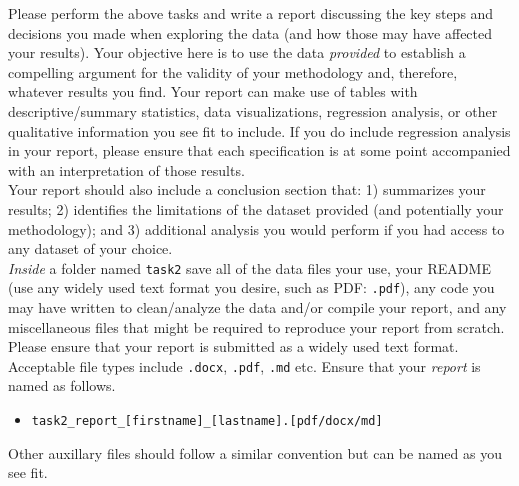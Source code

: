 \documentclass[11pt, letterpaper, twoside]{article}
\begin{document}
Please perform the above tasks and write a report discussing the key steps and decisions you made when exploring the data (and how those may have affected your results). Your objective here is to use the data \textit{provided} to establish a compelling argument for the validity of your methodology and, therefore, whatever results you find. Your report can make use of tables with descriptive/summary statistics, data visualizations, regression analysis, or other qualitative information you see fit to include. If you do include regression analysis in your report, please ensure that each specification is at some point accompanied with an interpretation of those results.\\

Your report should also include a conclusion section that: 1) summarizes your results; 2) identifies the limitations of the dataset provided (and potentially your methodology); and 3) additional analysis you would perform if you had access to any dataset of your choice.\\

\textit{Inside} a folder named \verb|task2| save all of the data files your use, your README (use any widely used text format you desire, such as PDF: \verb|.pdf|), any code you may have written to clean/analyze the data and/or compile your report, and any miscellaneous files that might be required to reproduce your report from scratch. Please ensure that your report is submitted as a widely used text format. Acceptable file types include \verb|.docx|, \verb|.pdf|, \verb|.md| etc. Ensure that your \textit{report} is named as follows.
\begin{itemize}
    \item \verb|task2_report_[firstname]_[lastname].[pdf/docx/md]|
\end{itemize}
Other auxillary files should follow a similar convention but can be named as you see fit.
\end{document}
